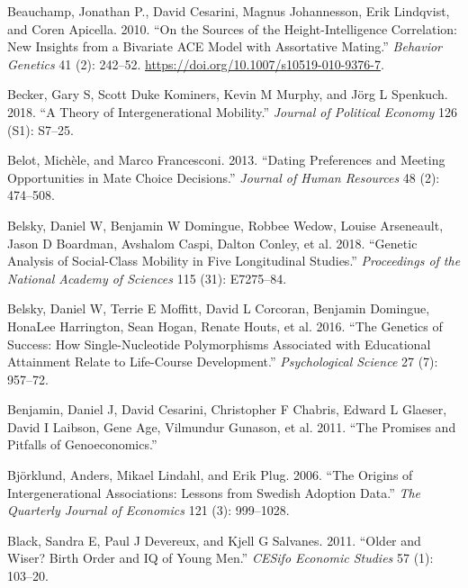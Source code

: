 \documentclass[
]{article}
\newlength{\cslhangindent}
\newlength{\cslentryspacingunit} %
\newenvironment{CSLReferences}[2] %
 {%
  \setlength{\parindent}{0pt}
  \ifodd #1
  \let\oldpar\par
  \def\par{\hangindent=\cslhangindent\oldpar}
  \fi
  \setlength{\parskip}{#2\cslentryspacingunit}
 }%
 {}
\theoremstyle{definition}
\theoremstyle{definition}
\theoremstyle{definition}
\theoremstyle{definition}
\theoremstyle{remark}
\begin{document}
\begin{CSLReferences}{1}{0}
\leavevmode{}%
Beauchamp, Jonathan P., David Cesarini, Magnus Johannesson, Erik Lindqvist, and Coren Apicella. 2010. {``On the Sources of the Height-Intelligence Correlation: New Insights from a Bivariate {ACE} Model with Assortative Mating.''} \emph{Behavior Genetics} 41 (2): 242--52. \url{https://doi.org/10.1007/s10519-010-9376-7}.

\leavevmode{}%
Becker, Gary S, Scott Duke Kominers, Kevin M Murphy, and Jörg L Spenkuch. 2018. {``A Theory of Intergenerational Mobility.''} \emph{Journal of Political Economy} 126 (S1): S7--25.

\leavevmode{}%
Belot, Michèle, and Marco Francesconi. 2013. {``Dating Preferences and Meeting Opportunities in Mate Choice Decisions.''} \emph{Journal of Human Resources} 48 (2): 474--508.

\leavevmode{}%
Belsky, Daniel W, Benjamin W Domingue, Robbee Wedow, Louise Arseneault, Jason D Boardman, Avshalom Caspi, Dalton Conley, et al. 2018. {``Genetic Analysis of Social-Class Mobility in Five Longitudinal Studies.''} \emph{Proceedings of the National Academy of Sciences} 115 (31): E7275--84.

\leavevmode{}%
Belsky, Daniel W, Terrie E Moffitt, David L Corcoran, Benjamin Domingue, HonaLee Harrington, Sean Hogan, Renate Houts, et al. 2016. {``The Genetics of Success: How Single-Nucleotide Polymorphisms Associated with Educational Attainment Relate to Life-Course Development.''} \emph{Psychological Science} 27 (7): 957--72.

\leavevmode{}%
Benjamin, Daniel J, David Cesarini, Christopher F Chabris, Edward L Glaeser, David I Laibson, Gene Age, Vilmundur Gunason, et al. 2011. {``The Promises and Pitfalls of Genoeconomics.''}

\leavevmode{}%
Björklund, Anders, Mikael Lindahl, and Erik Plug. 2006. {``The Origins of Intergenerational Associations: Lessons from Swedish Adoption Data.''} \emph{The Quarterly Journal of Economics} 121 (3): 999--1028.

\leavevmode{}%
Black, Sandra E, Paul J Devereux, and Kjell G Salvanes. 2011. {``Older and Wiser? Birth Order and IQ of Young Men.''} \emph{CESifo Economic Studies} 57 (1): 103--20.


\end{CSLReferences}
\end{document}
